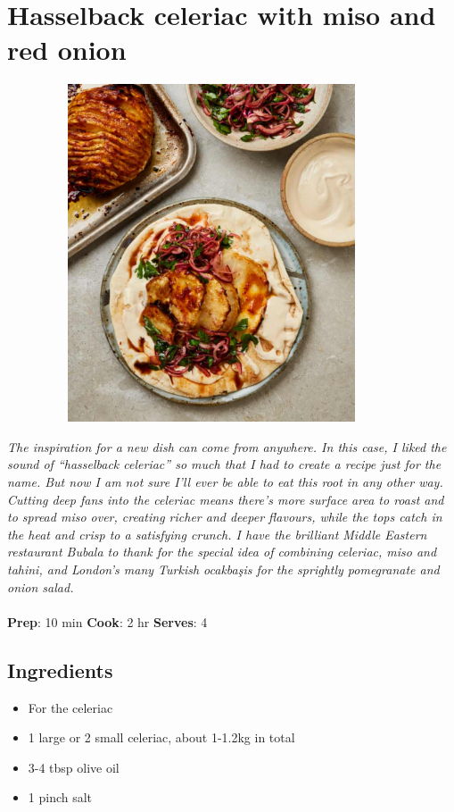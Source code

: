 \documentclass{book}
\begin{document}
\section{Hasselback celeriac with miso and red onion}
\begin{figure}
\centering\includegraphics[width=10cm,height=10cm,keepaspectratio]{Recipe_Pictures/Hasselback_celeriac_with_miso_and_red_onion.png}
\end{figure}
\emph{The inspiration for a new dish can come from anywhere. In this case, I liked the sound of “hasselback celeriac” so much that I had to create a recipe just for the name. But now I am not sure I’ll ever be able to eat this root in any other way. Cutting deep fans into the celeriac means there’s more surface area to roast and to spread miso over, creating richer and deeper flavours, while the tops catch in the heat and crisp to a satisfying crunch. I have the brilliant Middle Eastern restaurant Bubala to thank for the special idea of combining celeriac, miso and tahini, and London’s many Turkish ocakbaşis for the sprightly pomegranate and onion salad.}\\\\ 
\textbf{Prep}: 10 min
\textbf{Cook}: 2 hr
\textbf{Serves}: 4
\subsection*{Ingredients}
\begin{itemize}
\item For the celeriac
\item 1 large or 2 small celeriac, about 1-1.2kg in total
\item 3-4 tbsp olive oil
\item 1 pinch salt
\end{itemize}
\end{document}
